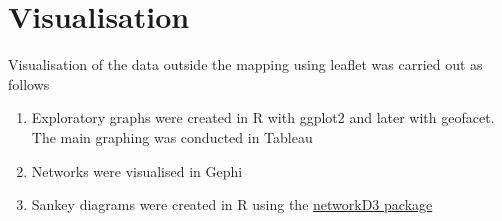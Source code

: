 \documentclass[openany]{book}
\theoremstyle{definition}
\theoremstyle{definition}
\theoremstyle{definition}
\theoremstyle{remark}
\begin{document}
\hypertarget{visualisation}{%
\section{Visualisation}\label{visualisation}}

Visualisation of the data outside the mapping using leaflet was carried
out as follows

\begin{enumerate}
\def\labelenumi{\arabic{enumi}.}
\item
  Exploratory graphs were created in R with ggplot2 and later with
  geofacet. The main graphing was conducted in Tableau
\item
  Networks were visualised in Gephi
\item
  Sankey diagrams were created in R using the
  \href{https://christophergandrud.github.io/networkD3/}{networkD3
  package}
\end{enumerate}


\end{document}
